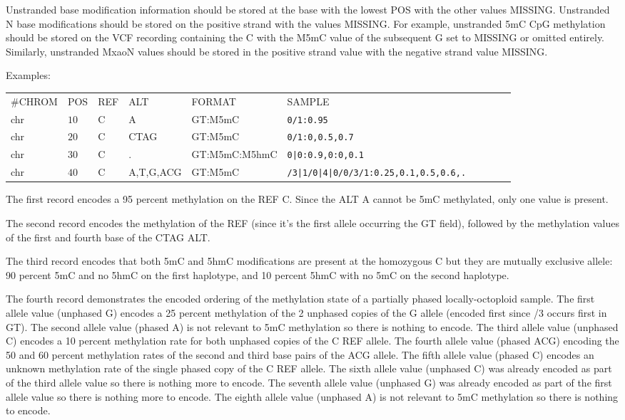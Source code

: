 \documentclass[8pt]{article}
\begin{document}
Unstranded base modification information should be stored at the base with the lowest POS with the other values MISSING.
Unstranded N base modifications should be stored on the positive strand with the values MISSING.
For example, unstranded 5mC CpG methylation should be stored on the VCF recording containing the C with the M5mC value of the subsequent G set to MISSING or omitted entirely. Similarly, unstranded MxaoN values should be stored in the positive strand value with the negative strand value MISSING.

Examples: 

\vspace{0.5em}
\begin{tabular}{ l l l l l l l l l l}
	\#CHROM & POS & REF & ALT & FORMAT & SAMPLE\\
	chr & $10$ & C & A         & GT:M5mC       & \tt{0/1:0.95}\\
	chr & $20$ & C & CTAG      & GT:M5mC       & \tt{0/1:0,0.5,0.7}\\
	chr & $30$ & C & .         & GT:M5mC:M5hmC & \tt{0|0:0.9,0:0,0.1}\\
	chr & $40$ & C & A,T,G,ACG & GT:M5mC       & \tt{/3|1/0|4|0/0/3/1:0.25,0.1,0.5,0.6,.}\\
\end{tabular}

The first record encodes a 95 percent methylation on the REF C.
Since the ALT A cannot be 5mC methylated, only one value is present.

The second record encodes the methylation of the REF (since it's the first allele occurring the GT field), followed by the methylation values of the first and fourth base of the CTAG ALT.

The third record encodes that both 5mC and 5hmC modifications are present at the homozygous C but they are mutually exclusive allele: 90 percent 5mC and no 5hmC on the first haplotype, and 10 percent 5hmC with no 5mC on the second haplotype.

The fourth record demonstrates the encoded ordering of the methylation state of a partially phased locally-octoploid sample.
The first   allele value (unphased G) encodes a 25 percent methylation of the 2 unphased copies of the G allele (encoded first since /3 occurs first in GT).
The second  allele value (phased A)   is not relevant to 5mC methylation so there is nothing to encode.
The third   allele value (unphased C) encodes a 10 percent methylation rate for both unphased copies of the C REF allele.
The fourth  allele value (phased ACG) encoding the 50 and 60 percent methylation rates of the second and third base pairs of the ACG allele.
The fifth   allele value (phased C)   encodes an unknown methylation rate of the single phased copy of the C REF allele.
The sixth   allele value (unphased C) was already encoded as part of the third allele value so there is nothing more to encode.
The seventh allele value (unphased G) was already encoded as part of the first allele value so there is nothing more to encode.
The eighth  allele value (unphased A) is not relevant to 5mC methylation so there is nothing to encode.
\end{document}
